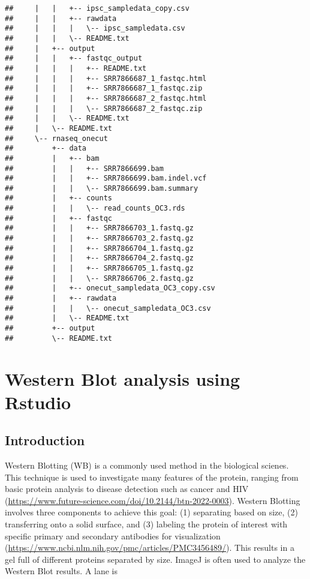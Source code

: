 \documentclass[
]{book}
\begin{document}
\begin{verbatim}
##     |   |   +-- ipsc_sampledata_copy.csv
##     |   |   +-- rawdata
##     |   |   |   \-- ipsc_sampledata.csv
##     |   |   \-- README.txt
##     |   +-- output
##     |   |   +-- fastqc_output
##     |   |   |   +-- README.txt
##     |   |   |   +-- SRR7866687_1_fastqc.html
##     |   |   |   +-- SRR7866687_1_fastqc.zip
##     |   |   |   +-- SRR7866687_2_fastqc.html
##     |   |   |   \-- SRR7866687_2_fastqc.zip
##     |   |   \-- README.txt
##     |   \-- README.txt
##     \-- rnaseq_onecut
##         +-- data
##         |   +-- bam
##         |   |   +-- SRR7866699.bam
##         |   |   +-- SRR7866699.bam.indel.vcf
##         |   |   \-- SRR7866699.bam.summary
##         |   +-- counts
##         |   |   \-- read_counts_OC3.rds
##         |   +-- fastqc
##         |   |   +-- SRR7866703_1.fastq.gz
##         |   |   +-- SRR7866703_2.fastq.gz
##         |   |   +-- SRR7866704_1.fastq.gz
##         |   |   +-- SRR7866704_2.fastq.gz
##         |   |   +-- SRR7866705_1.fastq.gz
##         |   |   \-- SRR7866706_2.fastq.gz
##         |   +-- onecut_sampledata_OC3_copy.csv
##         |   +-- rawdata
##         |   |   \-- onecut_sampledata_OC3.csv
##         |   \-- README.txt
##         +-- output
##         \-- README.txt
\end{verbatim}

\hypertarget{western-blot-analysis-using-rstudio}{%
\chapter{Western Blot analysis using Rstudio}\label{western-blot-analysis-using-rstudio}}

\hypertarget{introduction-3}{%
\section{Introduction}\label{introduction-3}}

Western Blotting (WB) is a commonly used method in the biological scienes. This technique is used to investigate many features of the protein, ranging from basic protein analysis to disease detection such as cancer and HIV (\url{https://www.future-science.com/doi/10.2144/btn-2022-0003}). Western Blotting involves three components to achieve this goal: (1) separating based on size, (2) transferring onto a solid surface, and (3) labeling the protein of interest with specific primary and secondary antibodies for visualization (\url{https://www.ncbi.nlm.nih.gov/pmc/articles/PMC3456489/}). This results in a gel full of different proteins separated by size. ImageJ is often used to analyze the Western Blot results. A lane is
\end{document}
